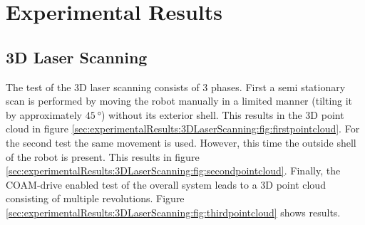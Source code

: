 \section{Experimental Results}
\label{sec:experimentalResults}

\subsection{3D Laser Scanning}
\label{sec:experimentalResults:3DLaserScanning}

The test of the 3D laser scanning consists of 3 phases.
First a semi stationary scan is performed by moving the robot manually in a limited manner (tilting it by approximately $\SI{45}{\degree}$) without its exterior shell.
This results in the 3D point cloud in figure \ref{sec:experimentalResults:3DLaserScanning:fig:firstpointcloud}.
For the second test the same movement is used.
However, this time the outside shell of the robot is present.
This results in figure \ref{sec:experimentalResults:3DLaserScanning:fig:secondpointcloud}.
Finally, the COAM-drive enabled test of the overall system leads to a 3D point cloud consisting of multiple revolutions.
Figure \ref{sec:experimentalResults:3DLaserScanning:fig:thirdpointcloud} shows results.

